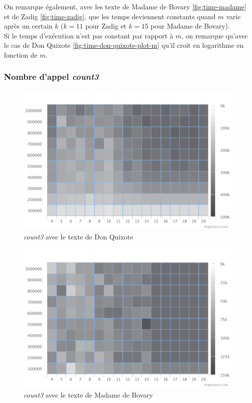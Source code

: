 \documentclass[10pt, a4paper]{article}
\begin{document}
On remarque également, avec les texte de Madame de Bovary \ref{fig:time-madame}
et de Zadig \ref{fig:time-zadig}, que les temps deviennent constants quand $m$
varie après un certain $k$ ($k=11$ pour Zadig et $k=15$ pour Madame de Bovary). \\

Si le temps d'exécution n'est pas constant par rapport à $m$, on remarque
qu'avec le cas de Don Quixote \ref{fig:time-don-quixote-plot-m} qu'il croit en
logarithme en fonction de $m$. \\

\subsubsection{Nombre d'appel \emph{count3}}

\begin{figure}[ht]
    \centering
    \includegraphics[width=1.0\textwidth]{count-don-quixote}
    \caption{\emph{count3} avec le texte de Don Quixote}
    \label{fig:count-don-quixote}
\end{figure}

\begin{figure}[ht]
    \centering
    \includegraphics[width=1.0\textwidth]{count-madame}
    \caption{\emph{count3} avec le texte de Madame de Bovary}
    \label{fig:count-madame}
\end{figure}
\end{document}
